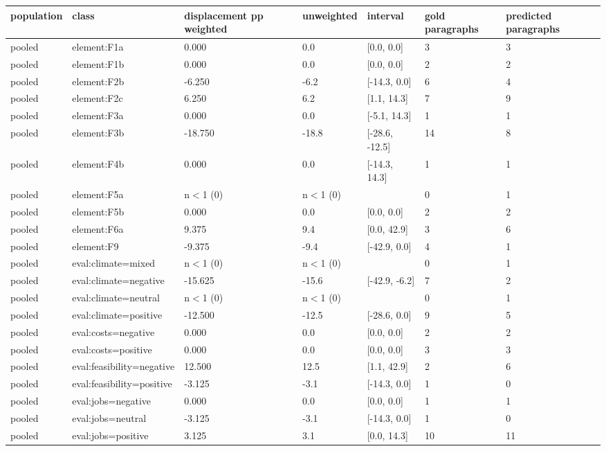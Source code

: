 \begin{table}[htbp]
\centering
\small
\begin{tabular}{lllllll}
\toprule
\textbf{population} & \textbf{class} & \textbf{displacement pp weighted} & \textbf{unweighted} & \textbf{interval} & \textbf{gold paragraphs} & \textbf{predicted paragraphs} \\
\midrule
pooled & element:F1a & 0.000 & 0.0 & [0.0, 0.0] & 3 & 3 \\
pooled & element:F1b & 0.000 & 0.0 & [0.0, 0.0] & 2 & 2 \\
pooled & element:F2b & -6.250 & -6.2 & [-14.3, 0.0] & 6 & 4 \\
pooled & element:F2c & 6.250 & 6.2 & [1.1, 14.3] & 7 & 9 \\
pooled & element:F3a & 0.000 & 0.0 & [-5.1, 14.3] & 1 & 1 \\
pooled & element:F3b & -18.750 & -18.8 & [-28.6, -12.5] & 14 & 8 \\
pooled & element:F4b & 0.000 & 0.0 & [-14.3, 14.3] & 1 & 1 \\
pooled & element:F5a & n$<$1 (0) & n$<$1 (0) &  & 0 & 1 \\
pooled & element:F5b & 0.000 & 0.0 & [0.0, 0.0] & 2 & 2 \\
pooled & element:F6a & 9.375 & 9.4 & [0.0, 42.9] & 3 & 6 \\
pooled & element:F9 & -9.375 & -9.4 & [-42.9, 0.0] & 4 & 1 \\
pooled & eval:climate=mixed & n$<$1 (0) & n$<$1 (0) &  & 0 & 1 \\
pooled & eval:climate=negative & -15.625 & -15.6 & [-42.9, -6.2] & 7 & 2 \\
pooled & eval:climate=neutral & n$<$1 (0) & n$<$1 (0) &  & 0 & 1 \\
pooled & eval:climate=positive & -12.500 & -12.5 & [-28.6, 0.0] & 9 & 5 \\
pooled & eval:costs=negative & 0.000 & 0.0 & [0.0, 0.0] & 2 & 2 \\
pooled & eval:costs=positive & 0.000 & 0.0 & [0.0, 0.0] & 3 & 3 \\
pooled & eval:feasibility=negative & 12.500 & 12.5 & [1.1, 42.9] & 2 & 6 \\
pooled & eval:feasibility=positive & -3.125 & -3.1 & [-14.3, 0.0] & 1 & 0 \\
pooled & eval:jobs=negative & 0.000 & 0.0 & [0.0, 0.0] & 1 & 1 \\
pooled & eval:jobs=neutral & -3.125 & -3.1 & [-14.3, 0.0] & 1 & 0 \\
pooled & eval:jobs=positive & 3.125 & 3.1 & [0.0, 14.3] & 10 & 11 \\

\end{tabular}
\end{table}
